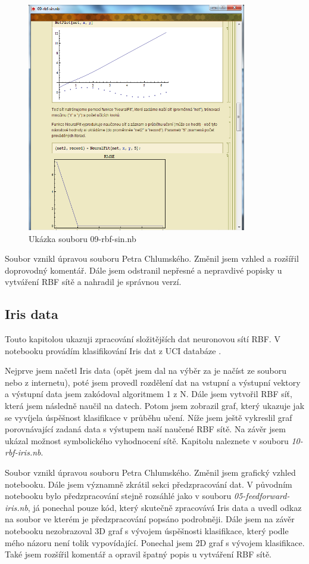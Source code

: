\documentclass[11pt,twoside,a4paper]{book}
\begin{document}
\begin{figure}[h!]
\begin{center}
\includegraphics[height=10cm]{figures/ukazka09.png}
\caption{Ukázka souboru 09-rbf-sin.nb}
\label{fig:rbf-sin}
\end{center}
\end{figure}

Soubor vznikl úpravou souboru Petra Chlumského. Změnil jsem vzhled a rozšířil doprovodný komentář. Dále jsem odstranil nepřesné a nepravdivé popisky u vytváření RBF sítě a nahradil je správnou verzí.
\newpage
\subsection{Iris data}
Touto kapitolou ukazuji zpracování složitějších dat neuronovou sítí RBF. V notebooku provádím klasifikování Iris dat z UCI databáze \cite{UCI}.

Nejprve jsem načetl Iris data (opět jsem dal na výběr za je načíst ze souboru nebo z internetu), poté jsem provedl rozdělení dat na vstupní a výstupní vektory a výstupní data jsem zakódoval algoritmem 1 z N. Dále jsem vytvořil RBF síť, která jsem následně naučil na datech. Potom jsem zobrazil graf, který ukazuje jak se vyvíjela úspěšnost klasifikace v průběhu učení. Níže jsem ještě vykreslil graf porovnávající zadaná data s výstupem naší naučené RBF sítě. Na závěr jsem ukázal možnost symbolického vyhodnocení sítě. Kapitolu naleznete v souboru \textit{10-rbf-iris.nb}.

Soubor vznikl úpravou souboru Petra Chlumského. Změnil jsem grafický vzhled notebooku. Dále jsem významně zkrátil sekci předzpracování dat. V původním notebooku bylo předzpracování stejně rozsáhlé jako v souboru \textit{05-feedforward-iris.nb}, já ponechal pouze kód, který skutečně zpracovává Iris data a uvedl odkaz na soubor ve kterém je předzpracování popsáno podrobněji. Dále jsem na závěr notebooku nezobrazoval 3D graf s vývojem úspěšnosti klasifikace, který podle mého názoru není tolik vypovídající. Ponechal jsem 2D graf s vývojem klasifikace. Také jsem rozšířil komentář a opravil špatný popis u vytváření RBF sítě.
\end{document}
